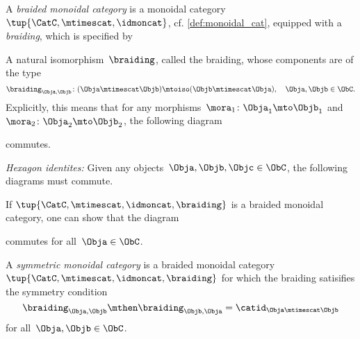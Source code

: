 \newpage

\begin{ctdefinition}
    \label{def:braided_moncat}
  A \emph{braided monoidal category} is a monoidal category~$\tup{\CatC,\mtimescat,\idmoncat}$,  cf. \cref{def:monoidal_cat}, equipped with a \emph{braiding}, which is specified by

  \constit
   \begin{compactenum}
   \item A natural isomorphism~$\braiding$, called the braiding, whose components are of the type
   \begin{equation}
       \label{eq:braiding_symmetry}
   \braiding_{\Obja,\Objb}\colon (\Obja\mtimescat \Objb)\mtoiso (\Objb\mtimescat \Obja), \quad \Obja,\Objb \in \ObC.
\end{equation}
   Explicitly, this means that for any morphisms~$\mora_1\colon \Obja_1\mto \Objb_1$ and~$\mora_2\colon \Obja_2\mto \Objb_2$, the following diagram
    \begin{center}
    \end{center}
    commutes.
   \end{compactenum}

  \condit
  \begin{compactenum}
    \item \emph{Hexagon identites:} Given any objects~$\Obja,\Objb,\Objc\in \ObC$, the following diagrams must commute.
  \end{compactenum}
    \begin{center}
    \end{center}
    \begin{center}
    \end{center}
\end{ctdefinition}

 \begin{remark} If $\tup{\CatC,\mtimescat,\idmoncat, \braiding}$ is a braided monoidal category, one can show that the diagram
    \begin{center}
    \end{center}
    commutes for all~$\Obja \in \ObC$.
  \end{remark}

\begin{ctdefinition}
    \label{def:sym-mon-cat}
  A \emph{symmetric monoidal category} is a braided monoidal category~$\tup{\CatC,\mtimescat,\idmoncat, \braiding}$ for which the braiding satisifies the symmetry condition
 \begin{equation}
     \label{eq:braiding-symmetry}
  \braiding_{\Obja,\Objb} \mthen \braiding_{\Objb,\Obja} = \catid_{\Obja \mtimescat \Objb}
\end{equation}
  for all~$\Obja, \Objb \in \ObC$.
  \end{ctdefinition}

